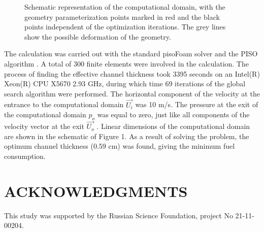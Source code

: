 \documentclass{aip-cp}
\begin{document}
\begin{figure}
\caption{Schematic representation of the computational domain, with the geometry parameterization points marked in red and the black points independent of the optimization iterations. The grey lines show the possible deformation of the geometry.}
\label{fig}
\end{figure}

The calculation was carried out with the standard pisoFoam solver and the PISO algorithm \cite{Issa1986_2,Issa1986_1}.
A total of 300 finite elements were involved in the calculation. The process of finding the effective channel thickness took 3395 seconds on an Intel(R) Xeon(R) CPU X5670 2.93 GHz, during which time 69 iterations of the global search algorithm were performed. The horizontal component of the velocity at the entrance to the computational domain $\vec{U_i}$  was 10 m/s. The pressure at the exit of the computational domain $p_o$ was equal to zero, just like all components of the velocity vector at the exit $\vec{U_o}$ . Linear dimensions of the computational domain are shown in the schematic of Figure 1. As a result of solving the problem, the optimum channel thickness (0.59 cm) was found, giving the minimum fuel consumption.

\section{ACKNOWLEDGMENTS}
This study was supported by the Russian Science Foundation, project No 21-11-00204.




%
%
\end{document}
